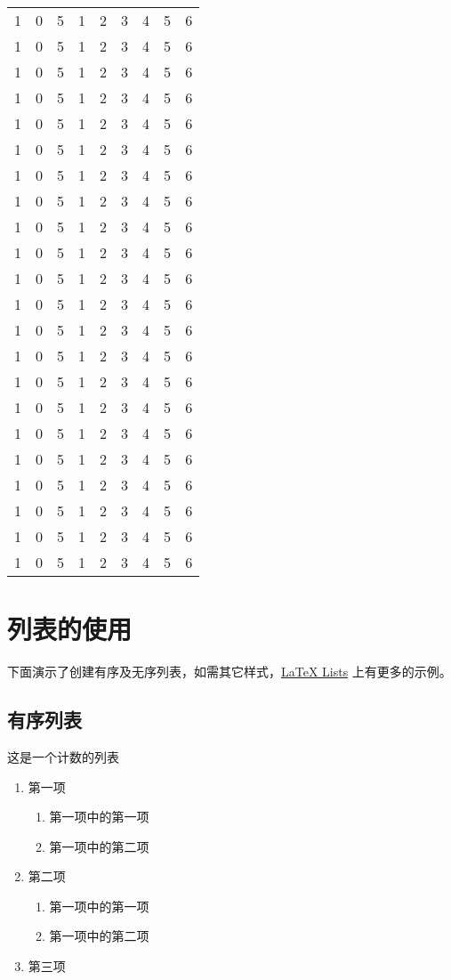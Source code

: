 \begin{xltabular}{\textwidth}{CCCCCCCCC}
  1 & 0 & 5 & 1 & 2 & 3 & 4 & 5 & 6 \\
  1 & 0 & 5 & 1 & 2 & 3 & 4 & 5 & 6 \\
  1 & 0 & 5 & 1 & 2 & 3 & 4 & 5 & 6 \\
  1 & 0 & 5 & 1 & 2 & 3 & 4 & 5 & 6 \\
  1 & 0 & 5 & 1 & 2 & 3 & 4 & 5 & 6 \\
  1 & 0 & 5 & 1 & 2 & 3 & 4 & 5 & 6 \\
  1 & 0 & 5 & 1 & 2 & 3 & 4 & 5 & 6 \\
  1 & 0 & 5 & 1 & 2 & 3 & 4 & 5 & 6 \\
  1 & 0 & 5 & 1 & 2 & 3 & 4 & 5 & 6 \\
  1 & 0 & 5 & 1 & 2 & 3 & 4 & 5 & 6 \\
  1 & 0 & 5 & 1 & 2 & 3 & 4 & 5 & 6 \\
  1 & 0 & 5 & 1 & 2 & 3 & 4 & 5 & 6 \\
  1 & 0 & 5 & 1 & 2 & 3 & 4 & 5 & 6 \\
  1 & 0 & 5 & 1 & 2 & 3 & 4 & 5 & 6 \\
  1 & 0 & 5 & 1 & 2 & 3 & 4 & 5 & 6 \\
  1 & 0 & 5 & 1 & 2 & 3 & 4 & 5 & 6 \\
  1 & 0 & 5 & 1 & 2 & 3 & 4 & 5 & 6 \\
  1 & 0 & 5 & 1 & 2 & 3 & 4 & 5 & 6 \\
  1 & 0 & 5 & 1 & 2 & 3 & 4 & 5 & 6 \\
  1 & 0 & 5 & 1 & 2 & 3 & 4 & 5 & 6 \\
  1 & 0 & 5 & 1 & 2 & 3 & 4 & 5 & 6 \\
  1 & 0 & 5 & 1 & 2 & 3 & 4 & 5 & 6 \\
\end{xltabular}


\section{列表的使用}
下面演示了创建有序及无序列表，如需其它样式，\href{https://www.latex-tutorial.com/tutorials/lists/}{LaTeX Lists} 上有更多的示例。

\subsection{有序列表}
这是一个计数的列表
\begin{enumerate}
  \item 第一项
        \begin{enumerate}
          \item 第一项中的第一项
          \item 第一项中的第二项
        \end{enumerate}
  \item 第二项
        \begin{enumerate}[label=(\roman*)]
          \item 第一项中的第一项
          \item 第一项中的第二项
        \end{enumerate}
  \item 第三项
\end{enumerate}

